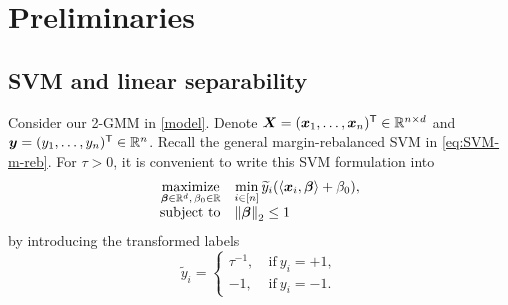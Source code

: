 \section{Preliminaries}
\label{sec:preliminary}

\subsection{SVM and linear separability} \label{sec:background}

Consider our 2-GMM in \cref{model}. Denote $\text{\boldmath $X$} = ({\boldsymbol{x}}_1,\ldots,{\boldsymbol{x}}_n)^{\sf T} \in \mathbb{R}^{n\times d}$ and $\text{\boldmath $y$} = (y_1,\ldots,y_n)^{\sf T} \in \mathbb{R}^n$. Recall the general margin-rebalanced SVM in \cref{eq:SVM-m-reb}. For $\tau > 0$, it is convenient to write this SVM formulation into
\begin{equation}
	\label{eq:SVM}
    \begin{array}{rl}
    \operatorname*{\mathrm{maximize}}\limits_{\text{\boldmath $\beta$} \in \mathbb{R}^d, \, \beta_0 \in \mathbb{R}} & \min\limits_{i \in [n]} \widetilde{y}_i ( \langle \text{\boldmath $x$}_i, \text{\boldmath $\beta$} \rangle + \beta_0 ), \\
    \text{subject to} & \left\|{\text{\boldmath $\beta$}}\right\|_2 \le 1
    \end{array}
\end{equation}
by introducing the transformed labels
\begin{equation}\label{eq:trans-labels}
    \tilde{y}_i = \begin{cases} \tau^{-1} , & \ \text{if} \ y_i = + 1, \\
    -1, & \ \text{if} \ y_i = -1. \end{cases}
\end{equation}


